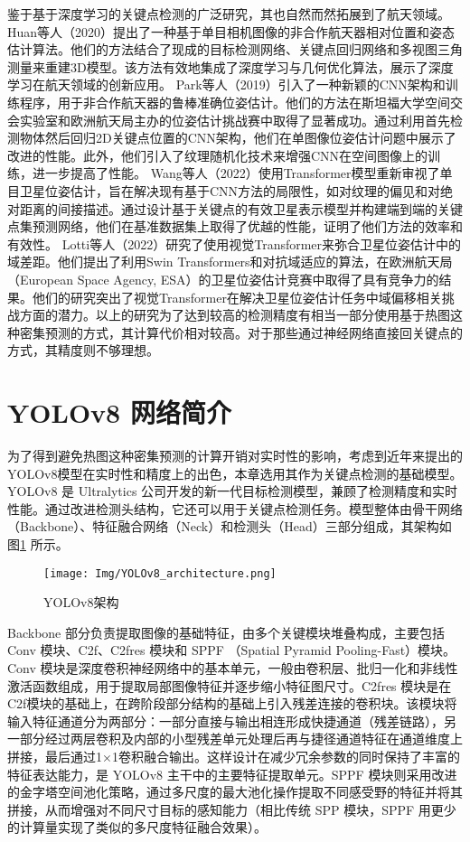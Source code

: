 鉴于基于深度学习的关键点检测的广泛研究，其也自然而然拓展到了航天领域。Huan等人（2020）提出了一种基于单目相机图像的非合作航天器相对位置和姿态估计算法\citep{huan2020pose}。他们的方法结合了现成的目标检测网络、关键点回归网络和多视图三角测量来重建3D模型。该方法有效地集成了深度学习与几何优化算法，展示了深度学习在航天领域的创新应用。
Park等人（2019）引入了一种新颖的CNN架构和训练程序，用于非合作航天器的鲁棒准确位姿估计\citep{park2019towards}。他们的方法在斯坦福大学空间交会实验室和欧洲航天局主办的位姿估计挑战赛中取得了显著成功。通过利用首先检测物体然后回归2D关键点位置的CNN架构，他们在单图像位姿估计问题中展示了改进的性能。此外，他们引入了纹理随机化技术来增强CNN在空间图像上的训练，进一步提高了性能。
Wang等人（2022）使用Transformer模型重新审视了单目卫星位姿估计，旨在解决现有基于CNN方法的局限性，如对纹理的偏见和对绝对距离的间接描述\citep{wang2022revisiting}。通过设计基于关键点的有效卫星表示模型并构建端到端的关键点集预测网络，他们在基准数据集上取得了优越的性能，证明了他们方法的效率和有效性。
Lotti等人（2022）研究了使用视觉Transformer来弥合卫星位姿估计中的域差距。他们提出了利用Swin Transformers和对抗域适应的算法，在欧洲航天局（European Space Agency, ESA）的卫星位姿估计竞赛中取得了具有竞争力的结果\citep{lotti2022investigating}。他们的研究突出了视觉Transformer在解决卫星位姿估计任务中域偏移相关挑战方面的潜力。以上的研究为了达到较高的检测精度有相当一部分使用基于热图这种密集预测的方式，其计算代价相对较高。对于那些通过神经网络直接回关键点的方式，其精度则不够理想。



\section{YOLOv8 网络简介}
为了得到避免热图这种密集预测的计算开销对实时性的影响，考虑到近年来提出的YOLOv8模型在实时性和精度上的出色，本章选用其作为关键点检测的基础模型。YOLOv8 是 Ultralytics 公司开发的新一代目标检测模型\cite{yolov8_ultralytics}，兼顾了检测精度和实时性能。通过改进检测头结构，它还可以用于关键点检测任务。模型整体由骨干网络（Backbone）、特征融合网络（Neck）和检测头（Head）三部分组成，其架构如图\ref{fig:YOLOv8_architecture} 所示。
\begin{figure}[htbp]
	\centering
	\texttt{[image: Img/YOLOv8\_architecture.png]}
	\caption{YOLOv8架构}
	\label{fig:YOLOv8_architecture}
	\vspace{-3ex}
\end{figure}
Backbone 部分负责提取图像的基础特征，由多个关键模块堆叠构成，主要包括 Conv 模块、C2f、C2fres 模块和 SPPF （Spatial Pyramid Pooling-Fast）模块。Conv 模块是深度卷积神经网络中的基本单元，一般由卷积层、批归一化和非线性激活函数组成，用于提取局部图像特征并逐步缩小特征图尺寸。C2fres 模块是在C2f模块的基础上，在跨阶段部分结构的基础上引入残差连接的卷积块。该模块将输入特征通道分为两部分：一部分直接与输出相连形成快捷通道（残差链路），另一部分经过两层卷积及内部的小型残差单元处理后再与捷径通道特征在通道维度上拼接，最后通过1×1卷积融合输出。这样设计在减少冗余参数的同时保持了丰富的特征表达能力，是 YOLOv8 主干中的主要特征提取单元。SPPF 模块则采用改进的金字塔空间池化策略，通过多尺度的最大池化操作提取不同感受野的特征并将其拼接，从而增强对不同尺寸目标的感知能力（相比传统 SPP 模块，SPPF 用更少的计算量实现了类似的多尺度特征融合效果）。 

